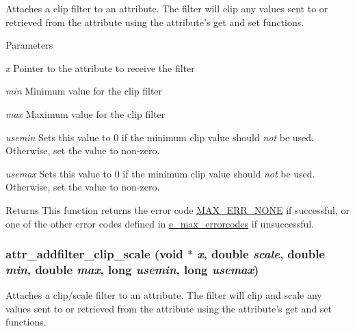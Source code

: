 Attaches a clip filter to an attribute. The filter will clip any values sent to or retrieved from the attribute using the attribute's {\ttfamily get} and {\ttfamily set} functions.


\begin{DoxyParams}{Parameters}
\item[{\em x}]Pointer to the attribute to receive the filter \item[{\em min}]Minimum value for the clip filter \item[{\em max}]Maximum value for the clip filter \item[{\em usemin}]Sets this value to 0 if the minimum clip value should {\itshape not\/} be used. Otherwise, set the value to non-\/zero. \item[{\em usemax}]Sets this value to 0 if the minimum clip value should {\itshape not\/} be used. Otherwise, set the value to non-\/zero.\end{DoxyParams}
\begin{DoxyReturn}{Returns}
This function returns the error code \hyperlink{group__misc_gga0764dd6c02b76cca7d053ae50555d69da6d22f77fef8b1e1b074cef5d29d935fd}{MAX\_\-ERR\_\-NONE} if successful, or one of the other error codes defined in \hyperlink{group__misc_ga0764dd6c02b76cca7d053ae50555d69d}{e\_\-max\_\-errorcodes} if unsuccessful. 
\end{DoxyReturn}
\hypertarget{group__attr_ga6ffcfda1ba4d552122e2cb1c5e10ebf6}{
\subsubsection[{attr\_\-addfilter\_\-clip\_\-scale}]{ attr\_\-addfilter\_\-clip\_\-scale (void $\ast$ {\em x}, \/  double {\em scale}, \/  double {\em min}, \/  double {\em max}, \/  long {\em usemin}, \/  long {\em usemax})}}
\label{group__attr_ga6ffcfda1ba4d552122e2cb1c5e10ebf6}


Attaches a clip/scale filter to an attribute. The filter will clip and scale any values sent to or retrieved from the attribute using the attribute's {\ttfamily get} and {\ttfamily set} functions.


